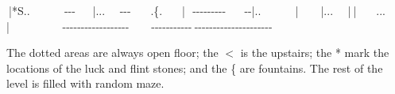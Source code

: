 {\mbox{$~$}}\allowbreak{}|*S\footnotemark[120]..{\mbox{$~$}}{\mbox{$~$}}{\mbox{$~$}}{\mbox{$~$}}{\mbox{$~$}}{\mbox{$~$}}{\mbox{$~$}}{\mbox{$~$}}{\mbox{$~$}}{\mbox{$~$}}{\mbox{$~$}}{\mbox{$~$}}{\mbox{$~$}}{\mbox{$~$}}-{}-{}-{}{\mbox{$~$}}{\mbox{$~$}}{\mbox{$~$}}{\mbox{$~$}}{\mbox{$~$}}{\mbox{$~$}}{\mbox{$~$}}\allowbreak{}|...{\mbox{$~$}}{\mbox{$~$}}{\mbox{$~$}}{\mbox{$~$}}{\mbox{$~$}}{\mbox{$~$}}-{}-{}-{}{\mbox{$~$}}{\mbox{$~$}}{\mbox{$~$}}{\mbox{$~$}}{\mbox{$~$}}{\mbox{$~$}}{\mbox{$~$}}{\mbox{$~$}}.\{\footnotemark[121].{\mbox{$~$}}{\mbox{$~$}}{\mbox{$~$}}{\mbox{$~$}}{\mbox{$~$}}{\mbox{$~$}}{\mbox{$~$}}{\mbox{$~$}}\allowbreak{}|{\mbox{$~$}}{\mbox{$~$}}{\mbox{$~$}}-{}-{}-{}-{}-{}-{}-{}-{}-{}{\mbox{$~$}}{\mbox{$~$}}$\text{ }$\newline{}
{\mbox{$~$}}-{}-{}\allowbreak{}|..{\mbox{$~$}}{\mbox{$~$}}{\mbox{$~$}}{\mbox{$~$}}{\mbox{$~$}}{\mbox{$~$}}{\mbox{$~$}}{\mbox{$~$}}{\mbox{$~$}}{\mbox{$~$}}{\mbox{$~$}}{\mbox{$~$}}{\mbox{$~$}}{\mbox{$~$}}\allowbreak{}|{\mbox{$~$}}{\mbox{$~$}}{\mbox{$~$}}{\mbox{$~$}}{\mbox{$~$}}{\mbox{$~$}}{\mbox{$~$}}{\mbox{$~$}}{\mbox{$~$}}\allowbreak{}|...{\mbox{$~$}}{\mbox{$~$}}{\mbox{$~$}}{\mbox{$~$}}{\mbox{$~$}}{\mbox{$~$}}\allowbreak{}|{\mbox{$~$}}\allowbreak{}|{\mbox{$~$}}{\mbox{$~$}}{\mbox{$~$}}{\mbox{$~$}}{\mbox{$~$}}{\mbox{$~$}}{\mbox{$~$}}{\mbox{$~$}}...{\mbox{$~$}}{\mbox{$~$}}{\mbox{$~$}}{\mbox{$~$}}{\mbox{$~$}}{\mbox{$~$}}{\mbox{$~$}}{\mbox{$~$}}\allowbreak{}|{\mbox{$~$}}{\mbox{$~$}}{\mbox{$~$}}{\mbox{$~$}}{\mbox{$~$}}{\mbox{$~$}}{\mbox{$~$}}{\mbox{$~$}}{\mbox{$~$}}{\mbox{$~$}}{\mbox{$~$}}{\mbox{$~$}}{\mbox{$~$}}{\mbox{$~$}}$\text{ }$\newline{}
{\mbox{$~$}}{\mbox{$~$}}{\mbox{$~$}}-{}-{}-{}-{}-{}-{}-{}-{}-{}-{}-{}-{}-{}-{}-{}-{}-{}-{}{\mbox{$~$}}{\mbox{$~$}}{\mbox{$~$}}{\mbox{$~$}}{\mbox{$~$}}{\mbox{$~$}}{\mbox{$~$}}{\mbox{$~$}}{\mbox{$~$}}-{}-{}-{}-{}-{}-{}-{}-{}-{}-{}-{}{\mbox{$~$}}-{}-{}-{}-{}-{}-{}-{}-{}-{}-{}-{}-{}-{}-{}-{}-{}-{}-{}-{}-{}-{}{\mbox{$~$}}{\mbox{$~$}}{\mbox{$~$}}{\mbox{$~$}}{\mbox{$~$}}{\mbox{$~$}}{\mbox{$~$}}{\mbox{$~$}}{\mbox{$~$}}{\mbox{$~$}}{\mbox{$~$}}{\mbox{$~$}}{\mbox{$~$}}{\mbox{$~$}}$\text{ }$\newline{}

The dotted areas are always open floor; the {\mbox{$<$}} is the upstairs; the * mark the locations of the luck and flint stones; and the \{ are fountains. The rest of the level is filled with random maze.

